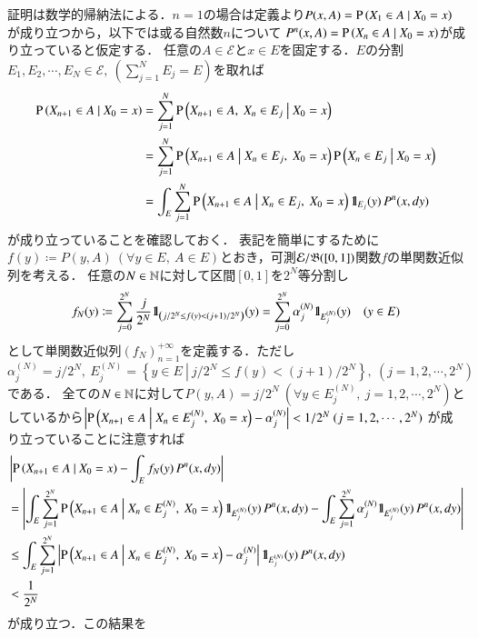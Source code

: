	\begin{prf}
		証明は数学的帰納法による．$n=1$の場合は定義より$P(x,A) = \operatorname{P} \left( X_1 \in A \ \middle|\ X_0 = x \right)$が成り立つから，以下では或る自然数$n$について
		$P^n(x,A) = \operatorname{P} \left( X_n \in A \ \middle|\ X_0 = x \right)$が成り立っていると仮定する．
		任意の$A \in \mathcal{E}$と$x \in E$を固定する．$E$の分割$E_1,E_2,\cdots,E_N \in \mathcal{E},\ (\sum_{j=1}^{N}E_j = E)$を取れば
		\begin{align}
			\cprob{X_{n+1} \in A}{X_0 = x} &= \sum_{j=1}^{N} \cprob{X_{n+1} \in A,\ X_n \in E_j}{X_0 = x} \\
			&= \sum_{j=1}^{N} \cprob{X_{n+1} \in A}{X_n \in E_j,\ X_0 = x}\cprob{X_n \in E_j}{X_0 = x} \\
			&= \int_{E} \sum_{j=1}^{N} \cprob{X_{n+1} \in A}{X_n \in E_j,\ X_0 = x} \defunc_{E_j}(y)\, P^n(x, dy)
		\end{align}
		が成り立っていることを確認しておく．
		表記を簡単にするために$f(y) \coloneqq P(y,A)\ (\forall y \in E,\ A \in E)$とおき，可測$\mathcal{E}/\mathfrak{B}([0,1])$関数$f$の単関数近似列を考える．
		任意の$N \in \mathbb{N}$に対して区間$[0,1]$を$2^N$等分割し
		\begin{align}
			f_N(y) \coloneqq \sum_{j = 0}^{2^N} \frac{j}{2^N} \mbox{1}\hspace{-0.25em}\mbox{l}_{\left( j/2^N \leq f(y) < (j+1)/2^N \right)} (y) = \sum_{j = 0}^{2^N} \alpha^{(N)}_j \mbox{1}\hspace{-0.25em}\mbox{l}_{E^{(N)}_j} (y) 
			\quad (y \in E)
		\end{align}
		として単関数近似列$(f_N)_{n=1}^{+\infty}$を定義する．ただし$\alpha^{(N)}_j = j/2^N,\ E^{(N)}_j = \left\{ y \in E\ \left|\ j/2^N \leq f(y) < (j+1)/2^N \right.\right\},\ (j=1,2,\cdots,2^N)$である．
		全ての$N \in \mathbb{N}$に対して$P(y, A) = j / 2^N\ (\forall y \in E^{(N)}_j,\ j=1,2,\cdots,2^N)$としているから$\left| \cprob{X_{n+1} \in A}{X_n \in E^{(N)}_j,\ X_0 = x} - \alpha^{(N)}_j \right| < 1/2^N\ (j=1,2,\cdots,2^N)$
		が成り立っていることに注意すれば
		\begin{align}
			&\left| \operatorname{P} \left( X_{n+1} \in A \ \middle|\ X_0 = x \right) - \int_{E} f_N(y)\, P^n(x,dy) \right| \\
			&= \left| \int_{E} \sum_{j=1}^{2^N} \operatorname{P} \left( X_{n+1} \in A \ \middle|\ X_n \in E^{(N)}_j,\ X_0 = x \right) \mbox{1}\hspace{-0.25em}\mbox{l}_{E^{(N)}_j}(y)\, P^n(x, dy) - \int_{E} \sum_{j=1}^{2^N} \alpha^{(N)}_j \mbox{1}\hspace{-0.25em}\mbox{l}_{E^{(N)}_j}(y)\, P^n(x, dy) \right| \\
			&\leq \int_{E} \sum_{j=1}^{2^N} \left| \operatorname{P} \left( X_{n+1} \in A \ \middle|\ X_n \in E^{(N)}_j,\ X_0 = x \right) - \alpha^{(N)}_j \right| \mbox{1}\hspace{-0.25em}\mbox{l}_{E^{(N)}_j}(y)\, P^n(x, dy) \\
			&< \frac{1}{2^N}
		\end{align}
		が成り立つ．この結果を
		\begin{align}

\end{align}
\end{prf}
